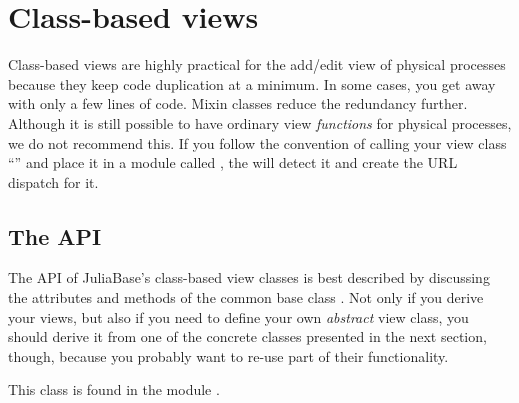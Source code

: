 \documentclass[a4paper,11pt,english]{sphinxmanual}
\begin{document}
\chapter{Class-based views}
\label{programming/class-based_views:class-based-views}\label{programming/class-based_views::doc}
Class-based views are highly practical for the add/edit view of physical
processes because they keep code duplication at a minimum.  In some cases, you
get away with only a few lines of code.  Mixin classes reduce the redundancy
further.  Although it is still possible to have ordinary view \emph{functions} for
physical processes, we do not recommend this.  If you follow the convention of
calling your view class “” and place it in a module called
, the {\hyperref[programming/utilities:samples.utils.urls.PatternGenerator]{}}
will detect it and create the URL dispatch for it.


\section{The API}
\label{programming/class-based_views:the-api}
The API of JuliaBase's class-based view classes is best described by discussing
the attributes and methods of the common base class
{\hyperref[programming/class-based_views:samples.utils.views.class_views.ProcessWithoutSamplesView]{}}.  Not
only if you derive your views, but also if you need to define your own
\emph{abstract} view class, you should derive it from one of the concrete classes
presented in the next section, though, because you probably want to re-use part
of their functionality.

This class is found in the module .
\end{document}
